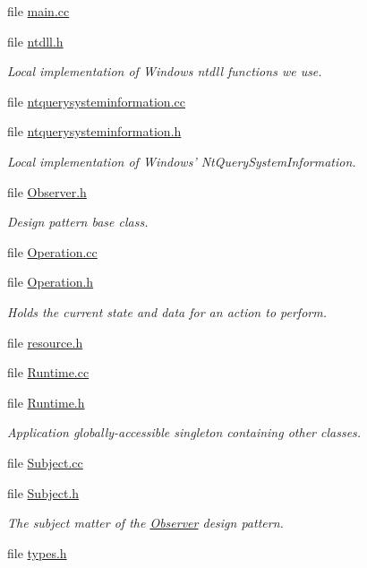 \begin{DoxyCompactItemize}
file \hyperlink{main_8cc}{main.\-cc}
\item 
file \hyperlink{ntdll_8h}{ntdll.\-h}
\begin{DoxyCompactList}\small\item\em Local implementation of Windows ntdll functions we use. \end{DoxyCompactList}\item 
file \hyperlink{ntquerysysteminformation_8cc}{ntquerysysteminformation.\-cc}
\item 
file \hyperlink{ntquerysysteminformation_8h}{ntquerysysteminformation.\-h}
\begin{DoxyCompactList}\small\item\em Local implementation of Windows' Nt\-Query\-System\-Information. \end{DoxyCompactList}\item 
file \hyperlink{_observer_8h}{Observer.\-h}
\begin{DoxyCompactList}\small\item\em Design pattern base class. \end{DoxyCompactList}\item 
file \hyperlink{_operation_8cc}{Operation.\-cc}
\item 
file \hyperlink{_operation_8h}{Operation.\-h}
\begin{DoxyCompactList}\small\item\em Holds the current state and data for an action to perform. \end{DoxyCompactList}\item 
file \hyperlink{resource_8h}{resource.\-h}
\item 
file \hyperlink{_runtime_8cc}{Runtime.\-cc}
\item 
file \hyperlink{_runtime_8h}{Runtime.\-h}
\begin{DoxyCompactList}\small\item\em Application globally-\/accessible singleton containing other classes. \end{DoxyCompactList}\item 
file \hyperlink{_subject_8cc}{Subject.\-cc}
\item 
file \hyperlink{_subject_8h}{Subject.\-h}
\begin{DoxyCompactList}\small\item\em The subject matter of the \hyperlink{class_observer}{Observer} design pattern. \end{DoxyCompactList}\item 
file \hyperlink{types_8h}{types.\-h}

\end{DoxyCompactItemize}

